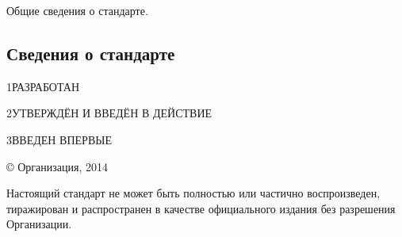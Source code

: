 \documentclass[12pt, twoside, final]{ruost}
\begin{document}
	\maketitle
	
	
		Общие сведения о стандарте.
	
		\subsection*{Сведения о стандарте}
	
		\par 1\OSTHspace{}РАЗРАБОТАН
		\par 2\OSTHspace{}УТВЕРЖДЁН И ВВЕДЁН В ДЕЙСТВИЕ
		\par 3\OSTHspace{}ВВЕДЕН ВПЕРВЫЕ
		
		\vfill
		\begin{flushright}
			\copyright{} Организация, 2014
		\end{flushright}
		
		Настоящий стандарт не может быть полностью или частично воспроизведен, тиражирован и
		распространен в качестве официального издания без разрешения Организации.
	
	\newpage
	\tableofcontents
	\newpage
	
\end{document}
